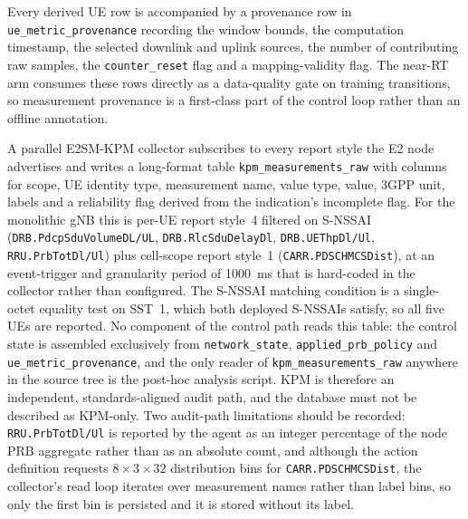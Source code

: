 Every derived UE row is accompanied by a provenance row in \texttt{ue\_metric\_provenance} recording the window bounds, the computation timestamp, the selected downlink and uplink sources, the number of contributing raw samples, the \texttt{counter\_reset} flag and a mapping-validity flag. The near-RT arm consumes these rows directly as a data-quality gate on training transitions, so measurement provenance is a first-class part of the control loop rather than an offline annotation.

A parallel E2SM-KPM collector subscribes to every report style the E2 node advertises and writes a long-format table \texttt{kpm\_measurements\_raw} with columns for scope, UE identity type, measurement name, value type, value, 3GPP unit, labels and a reliability flag derived from the indication's incomplete flag. For the monolithic gNB this is per-UE report style~4 filtered on S-NSSAI (\texttt{DRB.PdcpSduVolumeDL/UL}, \texttt{DRB.RlcSduDelayDl}, \texttt{DRB.UEThpDl/Ul}, \texttt{RRU.PrbTotDl/Ul}) plus cell-scope report style~1 (\texttt{CARR.PDSCHMCSDist}), at an event-trigger and granularity period of 1000~ms that is hard-coded in the collector rather than configured. The S-NSSAI matching condition is a single-octet equality test on SST~1, which both deployed S-NSSAIs satisfy, so all five UEs are reported. No component of the control path reads this table: the control state is assembled exclusively from \texttt{network\_state}, \texttt{applied\_prb\_policy} and \texttt{ue\_metric\_provenance}, and the only reader of \texttt{kpm\_measurements\_raw} anywhere in the source tree is the post-hoc analysis script. KPM is therefore an independent, standards-aligned audit path, and the database must not be described as KPM-only. Two audit-path limitations should be recorded: \texttt{RRU.PrbTotDl/Ul} is reported by the agent as an integer percentage of the node PRB aggregate rather than as an absolute count, and although the action definition requests $8\times3\times32$ distribution bins for \texttt{CARR.PDSCHMCSDist}, the collector's read loop iterates over measurement names rather than label bins, so only the first bin is persisted and it is stored without its label.

